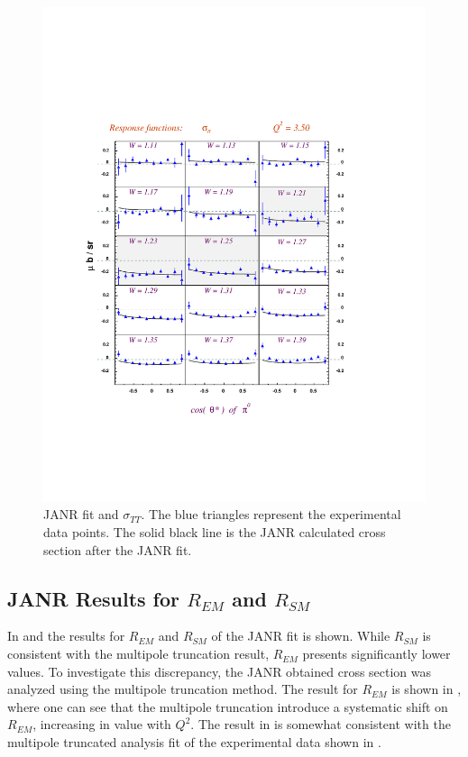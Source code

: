 \begin{figure}[h]
 \includegraphics[width = 13cm, bb=-30 140 480 640]{analysis/img/stt_Q23.50_Inn_L1}
  \caption[JANR fit of the cross section: $\sigma_T+\epsilon_L\sigma_L$]
{ JANR fit and  $\sigma_{TT}$. The blue triangles represent the experimental data points. The solid black line
 is the JANR calculated cross section after the JANR fit.}
 \label{fig:tt_Q23.50_Inn_L1}
\end{figure}

\cia  \vspace{-2cm}
\subsection{JANR Results for $R_{EM}$ and $R_{SM}$}
In  and  the results for $R_{EM}$ and $R_{SM}$ of the JANR fit is shown.
While $R_{SM}$ is consistent with the multipole truncation result, $R_{EM}$  presents  significantly lower values.
To investigate this discrepancy, the JANR obtained cross section was analyzed using the multipole truncation method.
The result for $R_{EM}$ is shown in , where one can see that the multipole truncation
introduce a systematic shift on $R_{EM}$, increasing in value with $Q^2$.
The result in  is somewhat consistent with the multipole truncated analysis fit of the experimental 
data shown in .

